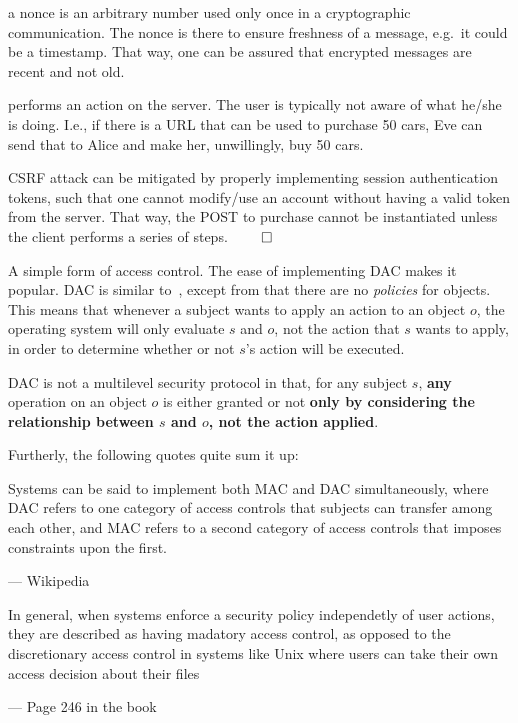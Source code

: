 \begin{definition}\label{nonce}
	a nonce is an arbitrary number used only once in a cryptographic communication.
	The nonce is there to ensure freshness of a message, e.g.\ it could be a
	timestamp. That way, one can be assured that encrypted messages are
	recent and not old.
\end{definition}

\begin{definition}[CSRF]
	performs an action on the server. The user is typically not aware 
	of what he/she is doing. I.e., if there is a URL that can be used
	to purchase 50 cars, Eve can send that to Alice and make her, unwillingly,
	buy 50 cars.

	CSRF attack can be mitigated by properly implementing session authentication
	tokens, such that one cannot modify/use an account without having a 
	valid token from the server. That way, the POST to purchase cannot be
	instantiated unless the client performs a series of steps.
	$\qedhere$
\end{definition}

\begin{definition}\label{DAC}
	A simple form of access control. The ease of implementing DAC makes it popular.
	DAC is similar to~, except
	from that there are no \textit{policies} for objects. This means that
	whenever a subject wants to apply an action to an object $o$,
	the operating system will only evaluate $s$ and $o$, not the action that $s$ wants 
	to apply, in order to determine whether or not $s$'s action will be executed.
\end{definition}

\begin{definition}\label{diffDACMAC}
	DAC is not a multilevel security protocol in that, for any subject 
	$s$, \textbf{any} operation on an object $o$ is either granted or not 
	\textbf{only by considering the relationship between $s$ and $o$, not
	the action applied}.
	
	Furtherly, the following quotes quite sum it up:
		\epigraph{Systems can be said to implement both MAC and DAC simultaneously,
		where DAC refers to one category of access controls that subjects can 
		transfer among each other, and MAC refers to a second category of access 
		controls that imposes constraints upon the first.}{--- \textup{Wikipedia}}

		\epigraph{In general, when systems enforce a security policy independetly 
		of user actions, they are described as having madatory access control,
		as opposed to the discretionary access control in systems like Unix where 
		users can take their own access decision about their files}
		{--- \textup{Page 246 in the book}}
\end{definition}

